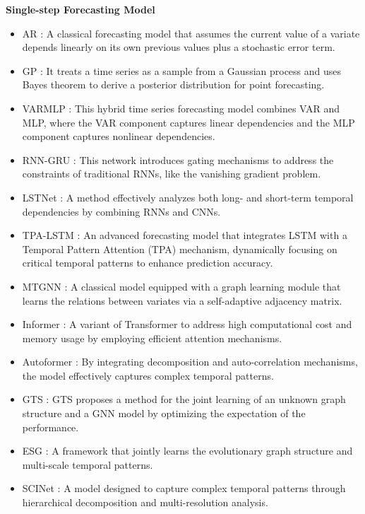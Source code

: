 \documentclass[final,12pt]{elsarticle}
\begin{document}
\noindent \textbf{Single-step Forecasting Model}
\begin{itemize}

\item AR \cite{box1976analysis}: 
A classical forecasting model 
that assumes the current value of a variate 
depends linearly on its own previous values 
plus a stochastic error term.

\item GP \cite{frigola2015bayesian}: 
It treats a time series as a sample from a Gaussian process 
and uses Bayes theorem 
to derive a posterior distribution for point forecasting.

\item VARMLP \cite{zhang2003time}: 
This hybrid time series forecasting model 
combines VAR and MLP, 
where the VAR component captures linear dependencies 
and the MLP component captures nonlinear dependencies.

\item RNN-GRU \cite{cho2014learning}: 
This network introduces gating mechanisms 
to address the constraints of traditional RNNs, 
like the vanishing gradient problem.

\item LSTNet \cite{lai2018modeling}: 
A method effectively analyzes both long- and short-term temporal dependencies 
by combining RNNs and CNNs.

\item TPA-LSTM \cite{shih2019temporal}: 
An advanced forecasting model 
that integrates LSTM with a Temporal Pattern Attention (TPA) mechanism, 
dynamically focusing on critical temporal patterns 
to enhance prediction accuracy.

\item MTGNN \cite{wu2020connecting}: 
A classical model equipped with a graph learning module 
that learns the relations between variates 
via a self-adaptive adjacency matrix.

\item Informer \cite{zhou2021informer}: 
A variant of Transformer 
to address high computational cost and memory usage 
by employing efficient attention mechanisms.

\item Autoformer \cite{wu2021autoformer}: 
By integrating decomposition and auto-correlation mechanisms, 
the model effectively captures complex temporal patterns.

\item GTS \cite{shang2021discrete}: 
GTS proposes a method 
for the joint learning 
of an unknown graph structure and a GNN model 
by optimizing the expectation of the performance.

\item ESG \cite{ye2022learning}: 
A framework that jointly learns the evolutionary graph structure 
and multi-scale temporal patterns.

\item SCINet \cite{liu2022scinet}: 
A model designed to capture complex temporal patterns 
through hierarchical decomposition and multi-resolution analysis.

\end{itemize}
\end{document}
